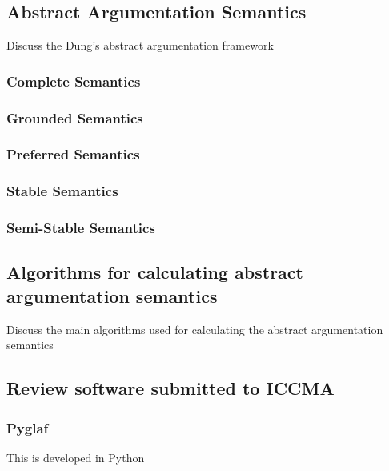 \subsection{Abstract Argumentation Semantics}
Discuss the Dung's abstract argumentation framework \cite{dung1995acceptability}

\subsubsection{Complete Semantics}

\subsubsection{Grounded Semantics}

\subsubsection{Preferred Semantics}

\subsubsection{Stable Semantics}

\subsubsection{Semi-Stable Semantics}

\subsection{Algorithms for calculating abstract argumentation semantics}
Discuss the main algorithms used for calculating the abstract argumentation semantics


\subsection{Review software submitted to ICCMA}
\subsubsection{Pyglaf}

This is developed in Python